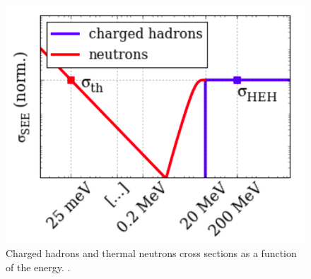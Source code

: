 \documentclass[encoding=utf8,british]{tumphthesis}
\begin{document}
\begin{minipage}[t]{0.40\linewidth}
\begin{figure}[H]
    \centering
    \includegraphics[width=1.0\linewidth]{figures/SEE_response.png}
    \caption{Charged hadrons and thermal neutrons cross sections as a function of the energy. \cite{Cecchetto:2282268}. }
    \label{fig:SEE-response}
\end{figure}
\end{minipage}
\hfill
\begin{minipage}[t]{0.55\linewidth}

\begin{table}[H]
\centering
\caption{SEE cross section and Weibull parameters of 32Mbit ISSI and 4Mbit Toshiba static random-access memory (\acrshort{sram}).}
\label{tab:memory_weibull_parameters}
\renewcommand{\arraystretch}{1.3}
\end{table}
\end{minipage}
\end{document}
